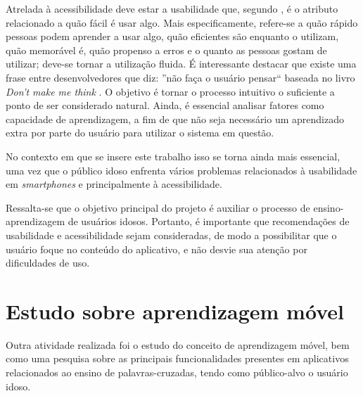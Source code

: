 Atrelada à acessibilidade deve estar a usabilidade que, segundo \cite{nielsenPrioritizingWebUsability},
é o atributo relacionado a quão fácil é usar algo. Mais especificamente, refere-se a quão rápido pessoas podem aprender a usar algo, quão eficientes são enquanto o utilizam, quão memorável é, quão propenso a erros e o quanto as pessoas gostam de utilizar; deve-se tornar a utilização fluida. É interessante destacar que existe uma frase entre desenvolvedores que diz: ''não faça o usuário pensar`` baseada no livro \textit{Don't make me think} \citep{steveDont2005}. O objetivo é tornar o processo intuitivo o suficiente a ponto de ser considerado natural.
Ainda, é essencial analisar fatores como capacidade de aprendizagem, a fim de que não seja necessário um aprendizado extra por parte do usuário para utilizar o sistema em questão.

No contexto em que se insere este trabalho isso se torna ainda mais essencial, uma vez que o público idoso enfrenta vários problemas relacionados à usabilidade em \textit{smartphones} \citep{dificuldadesIdosos} e principalmente à acessibilidade. %


Ressalta-se que o objetivo principal do projeto é auxiliar o processo de ensino-aprendizagem de usuários idosos. Portanto, é importante que recomendações de usabilidade e acessibilidade sejam consideradas, de modo a possibilitar que o usuário foque no conteúdo do aplicativo, e não desvie sua atenção por dificuldades de uso.

\section{Estudo sobre aprendizagem móvel}\label{sec:estudos_ap_movel} 
Outra atividade realizada foi o estudo do conceito de aprendizagem móvel, bem como uma pesquisa sobre as principais funcionalidades presentes em aplicativos relacionados ao ensino de palavras-cruzadas, tendo como público-alvo o usuário idoso.


